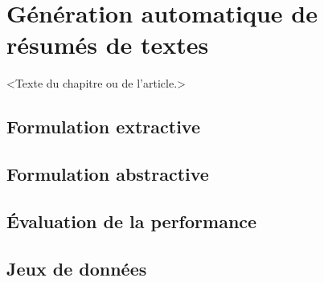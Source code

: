 \chapter{Génération automatique de résumés de textes}     %
\label{chap:resume}                   %

<Texte du chapitre ou de l'article.>

\section{Formulation extractive}

\section{Formulation abstractive}

\section{Évaluation de la performance}

\section{Jeux de données}